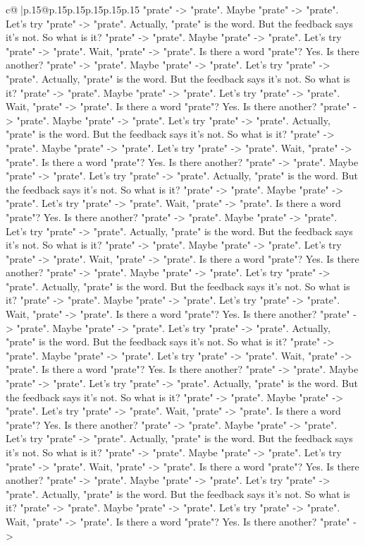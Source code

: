 \documentclass{article}
\begin{document}
{\begin{supertabular}{c@{$\;$}|p{.15\linewidth}@{}p{.15\linewidth}p{.15\linewidth}p{.15\linewidth}p{.15\linewidth}p{.15\linewidth}}
{{{"prate" {-}> "prate". Maybe "prate" {-}> "prate". Let's try "prate" {-}> "prate". Actually, "prate" is the word. But the feedback says it's not. So what is it? "prate" {-}> "prate". Maybe "prate" {-}> "prate". Let's try "prate" {-}> "prate". Wait, "prate" {-}> "prate". Is there a word "prate"? Yes. Is there another? "prate" {-}> "prate". Maybe "prate" {-}> "prate". Let's try "prate" {-}> "prate". Actually, "prate" is the word. But the feedback says it's not. So what is it? "prate" {-}> "prate". Maybe "prate" {-}> "prate". Let's try "prate" {-}> "prate". Wait, "prate" {-}> "prate". Is there a word "prate"? Yes. Is there another? "prate" {-}> "prate". Maybe "prate" {-}> "prate". Let's try "prate" {-}> "prate". Actually, "prate" is the word. But the feedback says it's not. So what is it? "prate" {-}> "prate". Maybe "prate" {-}> "prate". Let's try "prate" {-}> "prate". Wait, "prate" {-}> "prate". Is there a word "prate"? Yes. Is there another? "prate" {-}> "prate". Maybe "prate" {-}> "prate". Let's try "prate" {-}> "prate". Actually, "prate" is the word. But the feedback says it's not. So what is it? "prate" {-}> "prate". Maybe "prate" {-}> "prate". Let's try "prate" {-}> "prate". Wait, "prate" {-}> "prate". Is there a word "prate"? Yes. Is there another? "prate" {-}> "prate". Maybe "prate" {-}> "prate". Let's try "prate" {-}> "prate". Actually, "prate" is the word. But the feedback says it's not. So what is it? "prate" {-}> "prate". Maybe "prate" {-}> "prate". Let's try "prate" {-}> "prate". Wait, "prate" {-}> "prate". Is there a word "prate"? Yes. Is there another? "prate" {-}> "prate". Maybe "prate" {-}> "prate". Let's try "prate" {-}> "prate". Actually, "prate" is the word. But the feedback says it's not. So what is it? "prate" {-}> "prate". Maybe "prate" {-}> "prate". Let's try "prate" {-}> "prate". Wait, "prate" {-}> "prate". Is there a word "prate"? Yes. Is there another? "prate" {-}> "prate". Maybe "prate" {-}> "prate". Let's try "prate" {-}> "prate". Actually, "prate" is the word. But the feedback says it's not. So what is it? "prate" {-}> "prate". Maybe "prate" {-}> "prate". Let's try "prate" {-}> "prate". Wait, "prate" {-}> "prate". Is there a word "prate"? Yes. Is there another? "prate" {-}> "prate". Maybe "prate" {-}> "prate". Let's try "prate" {-}> "prate". Actually, "prate" is the word. But the feedback says it's not. So what is it? "prate" {-}> "prate". Maybe "prate" {-}> "prate". Let's try "prate" {-}> "prate". Wait, "prate" {-}> "prate". Is there a word "prate"? Yes. Is there another? "prate" {-}> "prate". Maybe "prate" {-}> "prate". Let's try "prate" {-}> "prate". Actually, "prate" is the word. But the feedback says it's not. So what is it? "prate" {-}> "prate". Maybe "prate" {-}> "prate". Let's try "prate" {-}> "prate". Wait, "prate" {-}> "prate". Is there a word "prate"? Yes. Is there another? "prate" {-}> "prate". Maybe "prate" {-}> "prate". Let's try "prate" {-}> "prate". Actually, "prate" is the word. But the feedback says it's not. So what is it? "prate" {-}> "prate". Maybe "prate" {-}> "prate". Let's try "prate" {-}> "prate". Wait, "prate" {-}> "prate". Is there a word "prate"? Yes. Is there another? "prate" {-}> }}}
\end{supertabular}}
\end{document}
